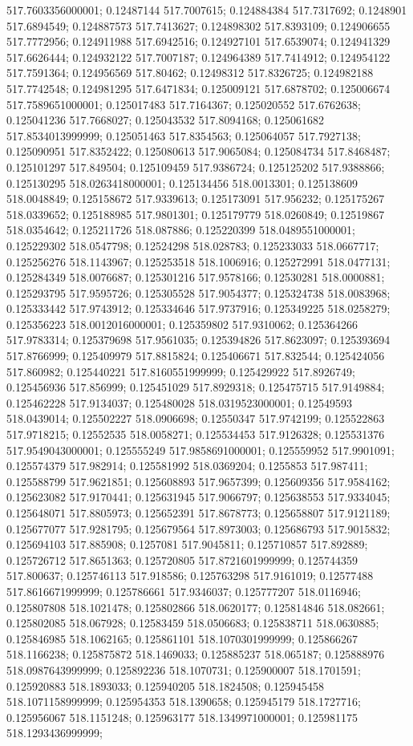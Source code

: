 517.7603356000001; 0.12487144 517.7007615; 0.124884384 517.7317692; 0.1248901 517.6894549; 0.124887573 517.7413627; 0.124898302 517.8393109; 0.124906655 517.7772956; 0.124911988 517.6942516; 0.124927101 517.6539074; 0.124941329 517.6626444; 0.124932122 517.7007187; 0.124964389 517.7414912; 0.124954122 517.7591364; 0.124956569 517.80462; 0.12498312 517.8326725; 0.124982188 517.7742548; 0.124981295 517.6471834; 0.125009121 517.6878702; 0.125006674 517.7589651000001; 0.125017483 517.7164367; 0.125020552 517.6762638; 0.125041236 517.7668027; 0.125043532 517.8094168; 0.125061682 517.8534013999999; 0.125051463 517.8354563; 0.125064057 517.7927138; 0.125090951 517.8352422; 0.125080613 517.9065084; 0.125084734 517.8468487; 0.125101297 517.849504; 0.125109459 517.9386724; 0.125125202 517.9388866; 0.125130295 518.0263418000001; 0.125134456 518.0013301; 0.125138609 518.0048849; 0.125158672 517.9339613; 0.125173091 517.956232; 0.125175267 518.0339652; 0.125188985 517.9801301; 0.125179779 518.0260849; 0.12519867 518.0354642; 0.125211726 518.087886; 0.125220399 518.0489551000001; 0.125229302 518.0547798; 0.12524298 518.028783; 0.125233033 518.0667717; 0.125256276 518.1143967; 0.125253518 518.1006916; 0.125272991 518.0477131; 0.125284349 518.0076687; 0.125301216 517.9578166; 0.12530281 518.0000881; 0.125293795 517.9595726; 0.125305528 517.9054377; 0.125324738 518.0083968; 0.125333442 517.9743912; 0.125334646 517.9737916; 0.125349225 518.0258279; 0.125356223 518.0012016000001; 0.125359802 517.9310062; 0.125364266 517.9783314; 0.125379698 517.9561035; 0.125394826 517.8623097; 0.125393694 517.8766999; 0.125409979 517.8815824; 0.125406671 517.832544; 0.125424056 517.860982; 0.125440221 517.8160551999999; 0.125429922 517.8926749; 0.125456936 517.856999; 0.125451029 517.8929318; 0.125475715 517.9149884; 0.125462228 517.9134037; 0.125480028 518.0319523000001; 0.12549593 518.0439014; 0.125502227 518.0906698; 0.12550347 517.9742199; 0.125522863 517.9718215; 0.12552535 518.0058271; 0.125534453 517.9126328; 0.125531376 517.9549043000001; 0.125555249 517.9858691000001; 0.125559952 517.9901091; 0.125574379 517.982914; 0.125581992 518.0369204; 0.1255853 517.987411; 0.125588799 517.9621851; 0.125608893 517.9657399; 0.125609356 517.9584162; 0.125623082 517.9170441; 0.125631945 517.9066797; 0.125638553 517.9334045; 0.125648071 517.8805973; 0.125652391 517.8678773; 0.125658807 517.9121189; 0.125677077 517.9281795; 0.125679564 517.8973003; 0.125686793 517.9015832; 0.125694103 517.885908; 0.1257081 517.9045811; 0.125710857 517.892889; 0.125726712 517.8651363; 0.125720805 517.8721601999999; 0.125744359 517.800637; 0.125746113 517.918586; 0.125763298 517.9161019; 0.12577488 517.8616671999999; 0.125786661 517.9346037; 0.125777207 518.0116946; 0.125807808 518.1021478; 0.125802866 518.0620177; 0.125814846 518.082661; 0.125802085 518.067928; 0.12583459 518.0506683; 0.125838711 518.0630885; 0.125846985 518.1062165; 0.125861101 518.1070301999999; 0.125866267 518.1166238; 0.125875872 518.1469033; 0.125885237 518.065187; 0.125888976 518.0987643999999; 0.125892236 518.1070731; 0.125900007 518.1701591; 0.125920883 518.1893033; 0.125940205 518.1824508; 0.125945458 518.1071158999999; 0.125954353 518.1390658; 0.125945179 518.1727716; 0.125956067 518.1151248; 0.125963177 518.1349971000001; 0.125981175 518.1293436999999; 